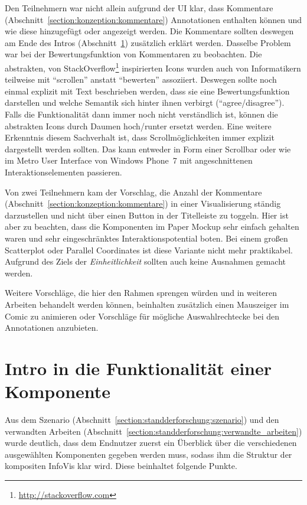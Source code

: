 \documentclass[
	headsepline,
	footsepline,
	fontsize=12pt,
	bibliography=totoc
]{scrbook}
\begin{document}
Den Teilnehmern war nicht allein aufgrund der UI klar, dass Kommentare (Abschnitt~\ref{section:konzeption:kommentare}) Annotationen enthalten können und wie diese hinzugefügt oder angezeigt werden. Die Kommentare sollten deswegen am Ende des Intros (Abschnitt~\ref{section:konzeption:intro}) zusätzlich erklärt werden. Dasselbe Problem war bei der Bewertungsfunktion von Kommentaren zu beobachten. Die abstrakten, von StackOverflow\footnote{\url{http://stackoverflow.com}} inspirierten Icons wurden auch von Informatikern teilweise mit \enquote{scrollen} anstatt \enquote{bewerten} assoziiert. Deswegen sollte noch einmal explizit mit Text beschrieben werden, dass sie eine Bewertungsfunktion darstellen und welche Semantik sich hinter ihnen verbirgt (\enquote{agree/disagree}). Falls die Funktionalität dann immer noch nicht verständlich ist, können die abstrakten Icons durch Daumen hoch/runter ersetzt werden. Eine weitere Erkenntnis diesem Sachverhalt ist, dass Scrollmöglichkeiten immer explizit dargestellt werden sollten. Das kann entweder in Form einer Scrollbar oder wie im Metro User Interface von Windows Phone~7 mit angeschnittenen Interaktionselementen passieren.

Von zwei Teilnehmern kam der Vorschlag, die Anzahl der Kommentare (Abschnitt~\ref{section:konzeption:kommentare}) in einer Visualisierung ständig darzustellen und nicht über einen Button in der Titelleiste zu toggeln. Hier ist aber zu beachten, dass die Komponenten im Paper Mockup sehr einfach gehalten waren und sehr eingeschränktes Interaktionspotential boten. Bei einem großen Scatterplot oder Parallel Coordinates ist diese Variante nicht mehr praktikabel. Aufgrund des Ziels der \emph{Einheitlichkeit} sollten auch keine Ausnahmen gemacht werden.

Weitere Vorschläge, die hier den Rahmen sprengen würden und in weiteren Arbeiten behandelt werden können, beinhalten zusätzlich einen Mauszeiger im Comic zu animieren oder Vorschläge für mögliche Auswahlrechtecke bei den Annotationen anzubieten.

\section{Intro in die Funktionalität einer Komponente}
\label{section:konzeption:intro}

Aus dem Szenario (Abschnitt~\ref{section:standderforschung:szenario}) und den verwandten Arbeiten (Abschnitt~\ref{section:standderforschung:verwandte_arbeiten}) wurde deutlich, dass dem Endnutzer zuerst ein Überblick über die verschiedenen ausgewählten Komponenten gegeben werden muss, sodass ihm die Struktur der kompositen InfoVis klar wird. Diese beinhaltet folgende Punkte.
\end{document}
